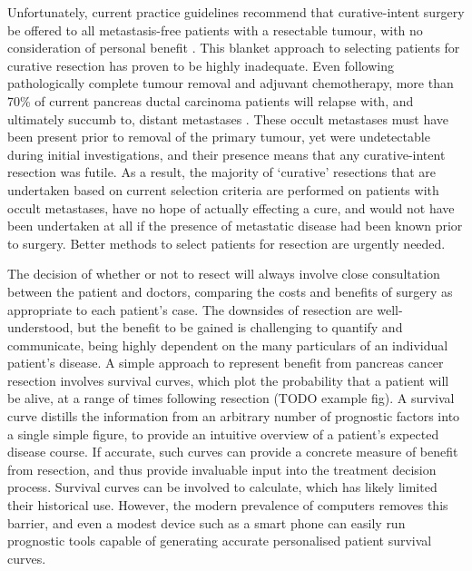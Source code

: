 \documentclass[dissertation.tex]{subfiles}
\begin{document}
Unfortunately, current practice guidelines recommend that curative-intent surgery be offered to all metastasis-free patients with a resectable tumour, with no consideration of personal benefit \cite{Editors2015}.  This blanket approach to selecting patients for curative resection has proven to be highly inadequate.  Even following pathologically complete tumour removal and adjuvant chemotherapy, more than 70\% of current pancreas ductal carcinoma patients will relapse with, and ultimately succumb to, distant metastases \cite{Barugola2007}.  These occult metastases must have been present prior to removal of the primary tumour, yet were undetectable during initial investigations, and their presence means that any curative-intent resection was futile.  As a result, the majority of `curative' resections that are undertaken based on current selection criteria are performed on patients with occult metastases, have no hope of actually effecting a cure, and would not have been undertaken at all if the presence of metastatic disease had been known prior to surgery.  Better methods to select patients for resection are urgently needed.

The decision of whether or not to resect will always involve close consultation between the patient and doctors, comparing the costs and benefits of surgery as appropriate to each patient's case.  The downsides of resection are well-understood, but the benefit to be gained is challenging to quantify and communicate, being highly dependent on the many particulars of an individual patient's disease.  A simple approach to represent benefit from pancreas cancer resection involves survival curves, which plot the probability that a patient will be alive, at a range of times following resection (TODO example fig).  A survival curve distills the information from an arbitrary number of prognostic factors into a single simple figure, to provide an intuitive overview of a patient's expected disease course.  If accurate, such curves can provide a concrete measure of benefit from resection, and thus provide invaluable input into the treatment decision process.  Survival curves can be involved to calculate, which has likely limited their historical use.  However, the modern prevalence of computers removes this barrier, and even a modest device such as a smart phone can easily run prognostic tools capable of generating accurate personalised patient survival curves.
\end{document}
